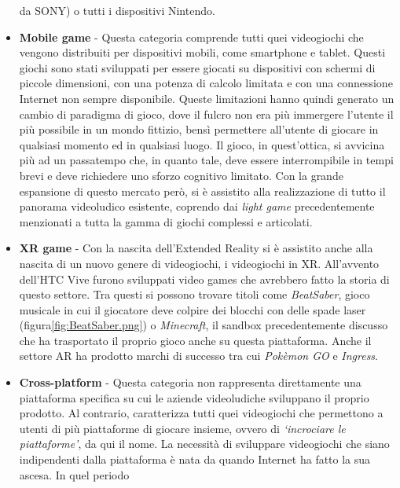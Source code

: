\begin{itemize}
                    da SONY) o tutti i dispositivi Nintendo. 
                \item \textbf{Mobile game} - Questa categoria comprende tutti quei videogiochi che vengono distribuiti per dispositivi mobili, come smartphone e tablet. Questi giochi
                    sono stati sviluppati per essere giocati su dispositivi con schermi di piccole dimensioni, con una potenza di calcolo limitata e con una connessione Internet
                    non sempre disponibile. Queste limitazioni hanno quindi generato un cambio di paradigma di gioco, dove il fulcro non era più immergere l'utente il più possibile
                    in un mondo fittizio, bensì permettere all'utente di giocare in qualsiasi momento ed in qualsiasi luogo. Il gioco, in quest'ottica, si avvicina più ad un passatempo
                    che, in quanto tale, deve essere interrompibile in tempi brevi e deve richiedere uno sforzo cognitivo limitato. Con la grande espansione di questo mercato però, si è
                    assistito alla realizzazione di tutto il panorama videoludico esistente, coprendo dai \textit{light game} precedentemente menzionati a tutta la gamma di giochi 
                    complessi e articolati.
                \item \textbf{XR game} - Con la nascita dell'Extended Reality si è assistito anche alla nascita di un nuovo genere di videogiochi, i videogiochi in XR. All'avvento
                    dell'HTC Vive furono sviluppati video games che avrebbero fatto la storia di questo settore. Tra questi si possono trovare titoli come \textit{BeatSaber}, gioco
                    musicale in cui il giocatore deve colpire dei blocchi con delle spade laser (figura\ref{fig:BeatSaber.png}) o \textit{Minecraft}, il sandbox precedentemente 
                    discusso che ha trasportato il proprio gioco anche su questa piattaforma. Anche il settore AR ha prodotto marchi di successo tra cui \textit{Pokèmon GO} e 
                    \textit{Ingress}.
                \item \textbf{Cross-platform} - Questa categoria non rappresenta direttamente una piattaforma specifica su cui le aziende videoludiche sviluppano il proprio prodotto.
                    Al contrario, caratterizza tutti quei videogiochi che permettono a utenti di più piattaforme di giocare insieme, ovvero di \textit{`incrociare le piattaforme'}, da qui
                    il nome. La necessità di sviluppare videogiochi che siano indipendenti dalla piattaforma è nata da quando Internet ha fatto la sua ascesa. In quel periodo

\end{itemize}

